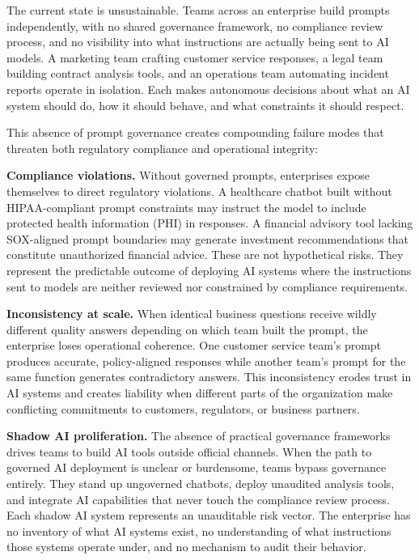 The current state is unsustainable. Teams across an enterprise build prompts independently, with no shared governance framework, no compliance review process, and no visibility into what instructions are actually being sent to AI models. A marketing team crafting customer service responses, a legal team building contract analysis tools, and an operations team automating incident reports operate in isolation. Each makes autonomous decisions about what an AI system should do, how it should behave, and what constraints it should respect.

This absence of prompt governance creates compounding failure modes that threaten both regulatory compliance and operational integrity:

\textbf{Compliance violations.} Without governed prompts, enterprises expose themselves to direct regulatory violations. A healthcare chatbot built without HIPAA-compliant prompt constraints may instruct the model to include protected health information (PHI) in responses. A financial advisory tool lacking SOX-aligned prompt boundaries may generate investment recommendations that constitute unauthorized financial advice. These are not hypothetical risks. They represent the predictable outcome of deploying AI systems where the instructions sent to models are neither reviewed nor constrained by compliance requirements.

\textbf{Inconsistency at scale.} When identical business questions receive wildly different quality answers depending on which team built the prompt, the enterprise loses operational coherence. One customer service team's prompt produces accurate, policy-aligned responses while another team's prompt for the same function generates contradictory answers. This inconsistency erodes trust in AI systems and creates liability when different parts of the organization make conflicting commitments to customers, regulators, or business partners.

\textbf{Shadow AI proliferation.} The absence of practical governance frameworks drives teams to build AI tools outside official channels. When the path to governed AI deployment is unclear or burdensome, teams bypass governance entirely. They stand up ungoverned chatbots, deploy unaudited analysis tools, and integrate AI capabilities that never touch the compliance review process. Each shadow AI system represents an unauditable risk vector. The enterprise has no inventory of what AI systems exist, no understanding of what instructions those systems operate under, and no mechanism to audit their behavior.

